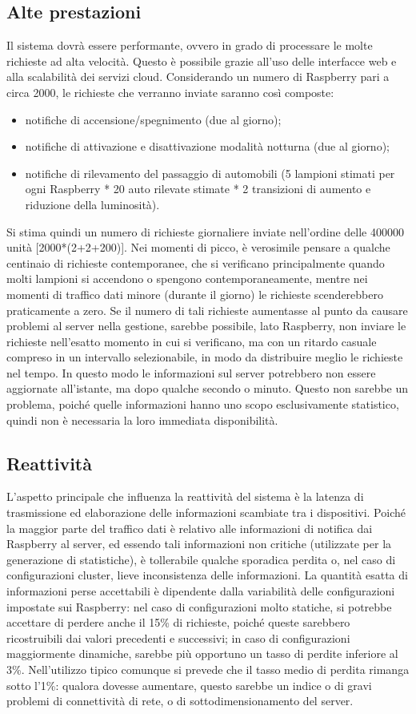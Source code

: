\subsection{Alte prestazioni}
Il sistema dovrà essere performante, ovvero in grado di processare le molte richieste ad alta velocità. Questo è possibile grazie all'uso delle interfacce web e alla scalabilità dei servizi cloud. Considerando un numero di Raspberry pari a circa 2000, le richieste che verranno inviate saranno così composte:
\begin{itemize}
 \item notifiche di accensione/spegnimento (due al giorno);
 \item notifiche di attivazione e disattivazione modalità notturna (due al giorno);
 \item notifiche di rilevamento del passaggio di automobili (5 lampioni stimati per ogni Raspberry * 20 auto rilevate stimate * 2 transizioni di aumento e riduzione della luminosità).
\end{itemize}
Si stima quindi un numero di richieste giornaliere inviate nell'ordine delle 400000 unità [2000*(2+2+200)].
Nei momenti di picco, è verosimile pensare a qualche centinaio di richieste contemporanee, che si verificano principalmente quando molti lampioni si accendono o spengono contemporaneamente, mentre nei momenti di traffico dati minore (durante il giorno) le richieste scenderebbero praticamente a zero. Se il numero di tali richieste aumentasse al punto da causare problemi al server nella gestione, sarebbe possibile, lato Raspberry, non inviare le richieste nell'esatto momento in cui si verificano, ma con un ritardo casuale compreso in un intervallo selezionabile, in modo da distribuire meglio le richieste nel tempo. In questo modo le informazioni sul server potrebbero non essere aggiornate all’istante, ma dopo qualche secondo o minuto. Questo non sarebbe un problema, poiché quelle informazioni hanno uno scopo esclusivamente statistico, quindi non è necessaria la loro immediata disponibilità.
\subsection{Reattività}
L'aspetto principale che influenza la reattività del sistema è la latenza di trasmissione ed elaborazione delle informazioni scambiate tra i dispositivi.
Poiché la maggior parte del traffico dati è relativo alle informazioni di notifica dai Raspberry al server, ed essendo tali informazioni non critiche (utilizzate per la generazione di statistiche), è tollerabile qualche sporadica perdita o, nel caso di configurazioni cluster, lieve inconsistenza delle informazioni. La quantità esatta di informazioni perse accettabili è dipendente dalla variabilità delle configurazioni impostate sui Raspberry: nel caso di configurazioni molto statiche, si potrebbe accettare di perdere anche il 15\% di richieste, poiché queste sarebbero ricostruibili dai valori precedenti e successivi; in caso di configurazioni maggiormente dinamiche, sarebbe più opportuno un tasso di perdite inferiore al 3\%. Nell’utilizzo tipico comunque si prevede che il tasso medio di perdita rimanga sotto l’1\%: qualora dovesse aumentare, questo sarebbe un indice o di gravi problemi di connettività di rete, o di sottodimensionamento del server.
